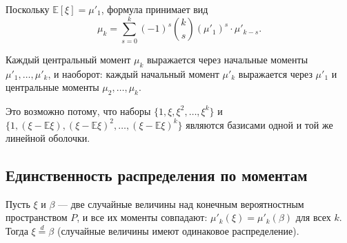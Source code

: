 \begin{Corollary}{}{}
	Поскольку $\mathbb{E}[\xi] = \mu'_1$, формула принимает вид
	\[
	\mu_k = \sum_{s=0}^{k} (-1)^s \binom{k}{s} (\mu'_1)^s \cdot \mu'_{k-s}.
	\]
\end{Corollary}

\begin{Corollary}{}{}
	Каждый центральный момент $\mu_k$ выражается через начальные моменты $\mu'_1, \ldots, \mu'_k$,
	и наоборот: каждый начальный момент $\mu'_k$ выражается через $\mu'_1$ и центральные моменты $\mu_2, \ldots, \mu_k$.
\end{Corollary}

\begin{Remark}{}{}
	Это возможно потому, что наборы
	$\{1,\xi,\xi^2,\ldots,\xi^k\}$ и
	$\{1,(\xi-\mathbb E\xi),(\xi-\mathbb E\xi)^2,\ldots,(\xi-\mathbb E\xi)^k\}$
	являются базисами одной и той же линейной оболочки.
\end{Remark}

\subsection{Единственность распределения по моментам}

\begin{Theorem}{}{}
	Пусть $\xi$ и $\beta$ — две случайные величины над конечным вероятностным пространством $P$,
	и все их моменты совпадают: $\mu'_k(\xi) = \mu'_k(\beta)$ для всех $k$.
	Тогда $\xi \overset{d}{=} \beta$ (случайные величины имеют одинаковое распределение).
\end{Theorem}

